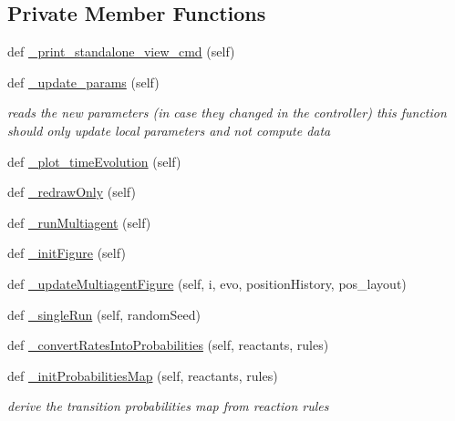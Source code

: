 \subsection*{Private Member Functions}
\begin{DoxyCompactItemize}
\item 
def \hyperlink{class_mu_mo_t_1_1_mu_mo_t_1_1_mu_mo_tmultiagent_view_a3af54c33f997937b14f422e772d5280a}{\+\_\+print\+\_\+standalone\+\_\+view\+\_\+cmd} (self)
\item 
def \hyperlink{class_mu_mo_t_1_1_mu_mo_t_1_1_mu_mo_tmultiagent_view_a47b00aaebcccf3c8dc2183a406404349}{\+\_\+update\+\_\+params} (self)
\begin{DoxyCompactList}\small\item\em reads the new parameters (in case they changed in the controller) this function should only update local parameters and not compute data \end{DoxyCompactList}\item 
def \hyperlink{class_mu_mo_t_1_1_mu_mo_t_1_1_mu_mo_tmultiagent_view_ace35072dcd3e51e67107f62b4de0d5fe}{\+\_\+plot\+\_\+time\+Evolution} (self)
\item 
def \hyperlink{class_mu_mo_t_1_1_mu_mo_t_1_1_mu_mo_tmultiagent_view_a57cea7fd9ea5c1805b9c18fc4b0adc0b}{\+\_\+redraw\+Only} (self)
\item 
def \hyperlink{class_mu_mo_t_1_1_mu_mo_t_1_1_mu_mo_tmultiagent_view_a62eb4d7a110764c65c992b5508540535}{\+\_\+run\+Multiagent} (self)
\item 
def \hyperlink{class_mu_mo_t_1_1_mu_mo_t_1_1_mu_mo_tmultiagent_view_a054aa0e8c130babbca21a6ff0e0fd31a}{\+\_\+init\+Figure} (self)
\item 
def \hyperlink{class_mu_mo_t_1_1_mu_mo_t_1_1_mu_mo_tmultiagent_view_a62d65f09387ea7930e7e2567edd23a9d}{\+\_\+update\+Multiagent\+Figure} (self, i, evo, position\+History, pos\+\_\+layout)
\item 
def \hyperlink{class_mu_mo_t_1_1_mu_mo_t_1_1_mu_mo_tmultiagent_view_a51d421aacb4cd83af5f1c2e60c3dff9c}{\+\_\+single\+Run} (self, random\+Seed)
\item 
def \hyperlink{class_mu_mo_t_1_1_mu_mo_t_1_1_mu_mo_tmultiagent_view_a63242960a1d4db3a17cc8657a8ee7da1}{\+\_\+convert\+Rates\+Into\+Probabilities} (self, reactants, rules)
\item 
def \hyperlink{class_mu_mo_t_1_1_mu_mo_t_1_1_mu_mo_tmultiagent_view_ad360a89687fc9a0298c853d76b8b8d95}{\+\_\+init\+Probabilities\+Map} (self, reactants, rules)
\begin{DoxyCompactList}\small\item\em derive the transition probabilities map from reaction rules \end{DoxyCompactList}\item 

\end{DoxyCompactItemize}
